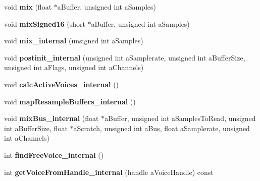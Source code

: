 \begin{DoxyCompactItemize}
\item 
\mbox{\label{class_so_loud_1_1_soloud_a2979c68d9d6378463821563f2d8269e9}} 
void {\bfseries mix} (float $\ast$a\+Buffer, unsigned int a\+Samples)
\item 
\mbox{\label{class_so_loud_1_1_soloud_ae7aab6e58183f9d5f109e6386ff2f449}} 
void {\bfseries mix\+Signed16} (short $\ast$a\+Buffer, unsigned int a\+Samples)
\item 
\mbox{\label{class_so_loud_1_1_soloud_af89412fb8b19db246b56eb017e75bc4a}} 
void {\bfseries mix\+\_\+internal} (unsigned int a\+Samples)
\item 
\mbox{\label{class_so_loud_1_1_soloud_ade35f116017d46dd4eada7595697b74d}} 
void {\bfseries postinit\+\_\+internal} (unsigned int a\+Samplerate, unsigned int a\+Buffer\+Size, unsigned int a\+Flags, unsigned int a\+Channels)
\item 
\mbox{\label{class_so_loud_1_1_soloud_a27ea4d65943bd01e043a755468d4308b}} 
void {\bfseries calc\+Active\+Voices\+\_\+internal} ()
\item 
\mbox{\label{class_so_loud_1_1_soloud_a11b0b06ee69108bd8efea0dc668a8daa}} 
void {\bfseries map\+Resample\+Buffers\+\_\+internal} ()
\item 
\mbox{\label{class_so_loud_1_1_soloud_a79111d501c5569f9d06af5dd933963f4}} 
void {\bfseries mix\+Bus\+\_\+internal} (float $\ast$a\+Buffer, unsigned int a\+Samples\+To\+Read, unsigned int a\+Buffer\+Size, float $\ast$a\+Scratch, unsigned int a\+Bus, float a\+Samplerate, unsigned int a\+Channels)
\item 
\mbox{\label{class_so_loud_1_1_soloud_af14d1d5b6d189c0ee77e95ae25523151}} 
int {\bfseries find\+Free\+Voice\+\_\+internal} ()
\item 
\mbox{\label{class_so_loud_1_1_soloud_a25d1fe31b9dbd04ca28c0bb35fd38491}} 
int {\bfseries get\+Voice\+From\+Handle\+\_\+internal} (handle a\+Voice\+Handle) const
\item 

\end{DoxyCompactItemize}
